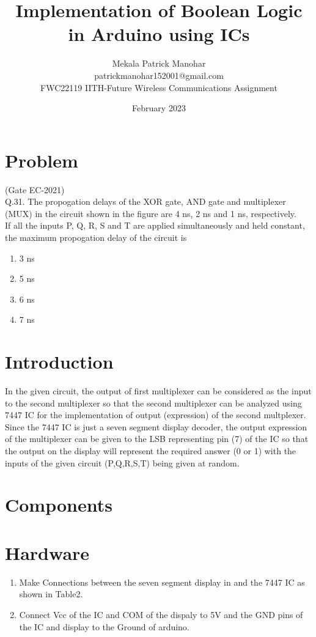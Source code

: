 \documentclass{article}
\title{Implementation of Boolean Logic in Arduino using ICs}
\date{February 2023}
\author{Mekala Patrick Manohar\\ patrickmanohar152001@gmail.com\\ FWC22119 IITH-Future Wireless Communications Assignment}
\begin{document}
\maketitle
	\tableofcontents

\section{Problem} 
		(Gate EC-2021)\\
Q.31. The propogation delays of the XOR gate, AND gate and multiplexer (MUX) in the circuit shown in the figure are 4 ns, 2 ns and 1 ns, respectively.\\

If all the inputs P, Q, R, S and T are applied simultaneously and held constant, the maximum propogation delay of the circuit is
\begin{enumerate}
	\item 3 ns \item 5 ns \item 6 ns \item 7 ns
\end{enumerate}
\section{Introduction}
		In the given circuit, the output of first multiplexer can be considered as the input to the second multiplexer so that the second multiplexer can be analyzed using 7447 IC for the implementation of output (expression) of the second multplexer. Since the 7447 IC is just a seven segment display decoder, the output expression of the multiplexer can be given to the LSB representing pin (7) of the IC so that the output on the display will represent the required answer (0 or 1) with the inputs of the given circuit (P,Q,R,S,T) being given at random.
\section{Components}
		
\section{Hardware}
		\begin{enumerate}
			\item Make Connections between the seven segment display in and the 7447 IC as shown in Table2.
				
			\item Connect Vcc of the IC and COM of the dispaly to 5V and the GND pins of the IC and display to the Ground of arduino.
		\end{enumerate}
\end{document}
